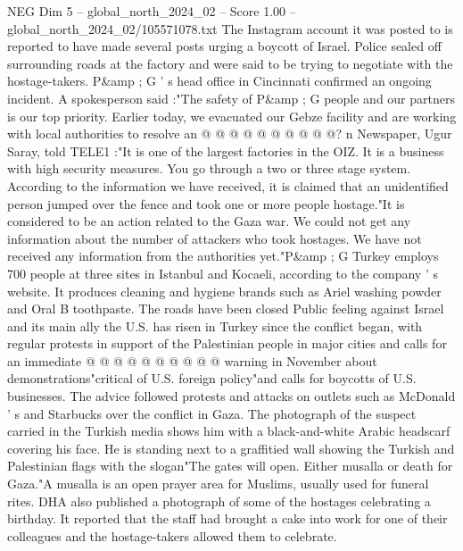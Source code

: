 \begin{textsample}{NEG Dim 5 – global\_north\_2024\_02 – Score 1.00 – global\_north\_2024\_02/105571078.txt}
The Instagram account it was posted to is reported to have made several posts urging a boycott of Israel.
Police sealed off surrounding roads at the factory and were said to be trying to negotiate with the hostage-takers.
P\&amp ; G ' s head office in Cincinnati confirmed an ongoing incident.
A spokesperson said :"The safety of P\&amp ; G people and our partners is our top priority.
Earlier today, we evacuated our Gebze facility and are working with local authorities to resolve an @ @ @ @ @ @ @ @ @ @? n Newspaper, Ugur Saray, told TELE1 :"It is one of the largest factories in the OIZ.
It is a business with high security measures.
You go through a two or three stage system.
According to the information we have received, it is claimed that an unidentified person jumped over the fence and took one or more people hostage."It is considered to be an action related to the Gaza war.
We could not get any information about the number of attackers who took hostages.
We have not received any information from the authorities yet."P\&amp ; G Turkey employs 700 people at three sites in Istanbul and Kocaeli, according to the company ' s website.
It produces cleaning and hygiene brands such as Ariel washing powder and Oral B toothpaste.
The roads have been closed Public feeling against Israel and its main ally the U.S. has risen in Turkey since the conflict began, with regular protests in support of the Palestinian people in major cities and calls for an immediate @ @ @ @ @ @ @ @ @ @ warning in November about demonstrations"critical of U.S. foreign policy"and calls for boycotts of U.S. businesses.
The advice followed protests and attacks on outlets such as McDonald ' s and Starbucks over the conflict in Gaza.
The photograph of the suspect carried in the Turkish media shows him with a black-and-white Arabic headscarf covering his face.
He is standing next to a graffitied wall showing the Turkish and Palestinian flags with the slogan"The gates will open.
Either musalla or death for Gaza."A musalla is an open prayer area for Muslims, usually used for funeral rites.
DHA also published a photograph of some of the hostages celebrating a birthday.
It reported that the staff had brought a cake into work for one of their colleagues and the hostage-takers allowed them to celebrate.

\end{textsample}
